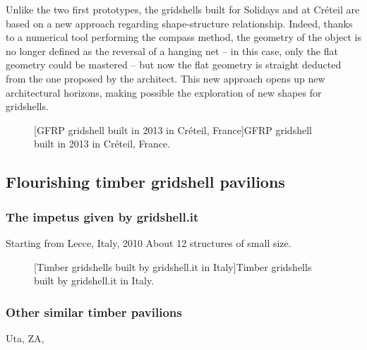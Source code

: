 Unlike the two first prototypes, the gridshells built for Solidays and at Créteil are based on a new approach regarding shape-structure relationship. Indeed, thanks to a numerical tool performing the compass method, the geometry of the object is no longer defined as the reversal of a hanging net – in this case, only the flat geometry could be mastered \cite{Addis2013} – but now the flat geometry is straight deducted from the one proposed by the architect.
This new approach opens up new architectural horizons, making possible the exploration of new shapes for gridshells.
\begin{figure}[h]
		\hspace*{\fill}
		\vspace{10pt}
		[GFRP gridshell built in 2013 in Créteil, France]{GFRP gridshell built in 2013 in Créteil, France.}
		\label{fig:creteil}    
\end{figure}

\subsection{Flourishing timber gridshell pavilions}
\subsubsection{The impetus given by gridshell.it}

Starting from Lecce, Italy, 2010
About 12 structures of small size.

\begin{figure}[h]
		\hspace*{\fill}
		\vspace{10pt}
		[Timber gridshells built by gridshell.it in Italy]{Timber gridshells built by gridshell.it in Italy.}
		\label{fig:gsii}    
\end{figure}

\subsubsection{Other similar timber pavilions}

Uta, ZA, 

